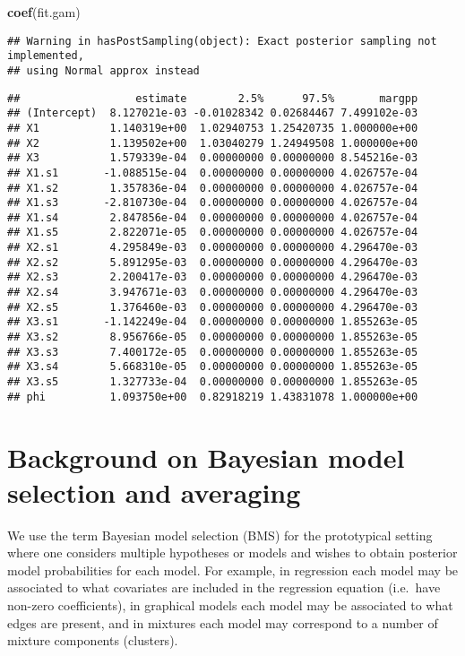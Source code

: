 \documentclass[
]{book}
\newenvironment{Shaded}{\begin{snugshade}}{\end{snugshade}}
\newcommand{\FunctionTok}[1]{\textcolor[rgb]{0.13,0.29,0.53}{\textbf{#1}}}
\newcommand{\NormalTok}[1]{#1}
\theoremstyle{definition}
\theoremstyle{definition}
\theoremstyle{definition}
\theoremstyle{definition}
\theoremstyle{remark}
\begin{document}
\begin{Shaded}
\begin{Highlighting}[]
\FunctionTok{coef}\NormalTok{(fit.gam)}
\end{Highlighting}
\end{Shaded}

\begin{verbatim}
## Warning in hasPostSampling(object): Exact posterior sampling not implemented,
## using Normal approx instead
\end{verbatim}

\begin{verbatim}
##                  estimate        2.5%      97.5%       margpp
## (Intercept)  8.127021e-03 -0.01028342 0.02684467 7.499102e-03
## X1           1.140319e+00  1.02940753 1.25420735 1.000000e+00
## X2           1.139502e+00  1.03040279 1.24949508 1.000000e+00
## X3           1.579339e-04  0.00000000 0.00000000 8.545216e-03
## X1.s1       -1.088515e-04  0.00000000 0.00000000 4.026757e-04
## X1.s2        1.357836e-04  0.00000000 0.00000000 4.026757e-04
## X1.s3       -2.810730e-04  0.00000000 0.00000000 4.026757e-04
## X1.s4        2.847856e-04  0.00000000 0.00000000 4.026757e-04
## X1.s5        2.822071e-05  0.00000000 0.00000000 4.026757e-04
## X2.s1        4.295849e-03  0.00000000 0.00000000 4.296470e-03
## X2.s2        5.891295e-03  0.00000000 0.00000000 4.296470e-03
## X2.s3        2.200417e-03  0.00000000 0.00000000 4.296470e-03
## X2.s4        3.947671e-03  0.00000000 0.00000000 4.296470e-03
## X2.s5        1.376460e-03  0.00000000 0.00000000 4.296470e-03
## X3.s1       -1.142249e-04  0.00000000 0.00000000 1.855263e-05
## X3.s2        8.956766e-05  0.00000000 0.00000000 1.855263e-05
## X3.s3        7.400172e-05  0.00000000 0.00000000 1.855263e-05
## X3.s4        5.668310e-05  0.00000000 0.00000000 1.855263e-05
## X3.s5        1.327733e-04  0.00000000 0.00000000 1.855263e-05
## phi          1.093750e+00  0.82918219 1.43831078 1.000000e+00
\end{verbatim}

\chapter{Background on Bayesian model selection and averaging}\label{background-bms}

We use the term Bayesian model selection (BMS) for the prototypical setting where one considers multiple hypotheses or models and wishes to obtain posterior model probabilities for each model.
For example, in regression each model may be associated to what covariates are included in the regression equation (i.e.~have non-zero coefficients), in graphical models each model may be associated to what edges are present, and in mixtures each model may correspond to a number of mixture components (clusters).
\end{document}
